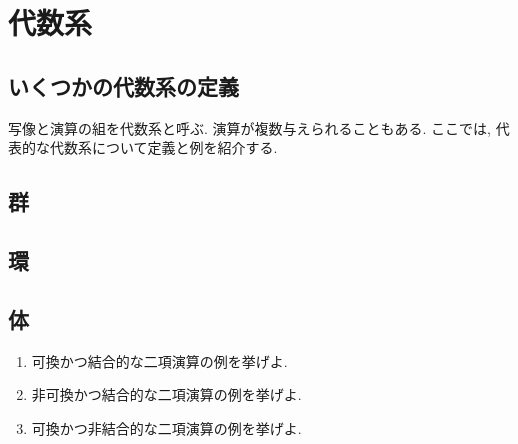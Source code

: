 \chapter{代数系}
\section{いくつかの代数系の定義}
写像と演算の組を代数系と呼ぶ.
演算が複数与えられることもある.
ここでは,
代表的な代数系について定義と例を紹介する.
\section{群}
\section{環}
\section{体}
\begin{enumerate}
\item 可換かつ結合的な二項演算の例を挙げよ.
\item 非可換かつ結合的な二項演算の例を挙げよ.
\item 可換かつ非結合的な二項演算の例を挙げよ.
\end{enumerate}



    
